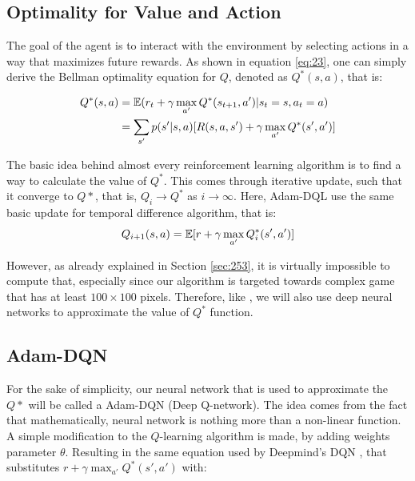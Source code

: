 	\subsection{Optimality for Value and Action}
	The goal of the agent is to interact with the environment by selecting actions in a way
    that maximizes future rewards. As shown in equation \ref{eq:23}, one can simply derive the Bellman optimality equation for $Q$, denoted as $Q^*(s,a)$, that is:
    
     \begin{equation}
            \begin{split}
                Q^*(s,a)& =\operatorname*{\mathbb{E}}(r_t+\gamma \max_{a'}Q^*(s_{t+1},a')|s_t=s,a_t=a) \\
                & = \sum_{s'}p(s'|s,a)[R(s,a,s')+\gamma\max_{a'}Q^*(s',a')]
            \end{split}
    \end{equation}
    
    The basic idea behind almost every reinforcement learning algorithm is to find a way to calculate the value of $Q^*$. This comes through iterative update, such that it converge to $Q*$, that is, $Q_i \to Q^*$ as $i \to \infty$. Here, Adam-DQL use the same basic update for temporal difference algorithm, that is:
    \begin{equation}
        Q_{i+1}(s,a)=\operatorname*{\mathbb{E}}[r+\gamma\max_{a'}Q_i^*(s',a')]
    \end{equation}
    
    However, as already explained in Section \ref{sec:253}, it is virtually impossible to compute that, especially since our algorithm is targeted towards complex game that has at least $100 \times 100$ pixels. Therefore, like \cite{mnih2015humanlevel}, we will also use deep neural networks to approximate the value of $Q^*$ function.
    
    \subsection{Adam-DQN}  
    For the sake of simplicity, our neural network that is used to approximate the $Q*$ will be called a Adam-DQN (Deep Q-network). The idea comes from the fact that mathematically, neural network is nothing more than a non-linear function. A simple modification to the $Q$-learning algorithm is made, by adding weights parameter $\theta$. Resulting in the same equation used by Deepmind's DQN \cite{mnih2015humanlevel}, that substitutes $r+\gamma\max_{a'}Q^*(s',a')$ with:
    
